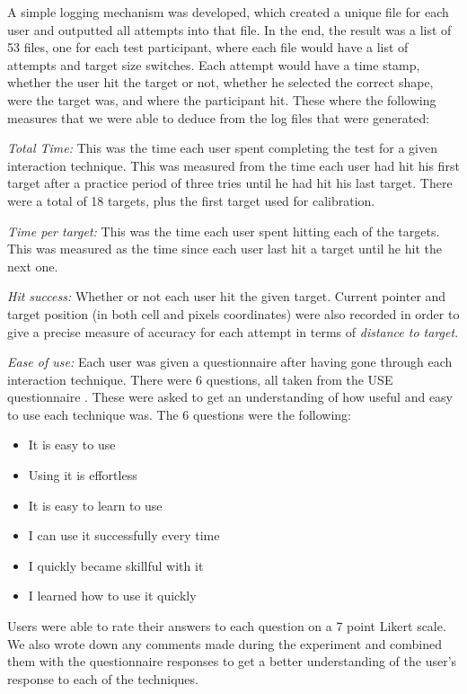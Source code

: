 A simple logging mechanism was developed, which created a unique file for each user and outputted all attempts into that file. 
In the end, the result was a list of 53 files, one for each test participant, where each file would have a list of attempts and target size switches. 
Each attempt would have a time stamp, whether the user hit the target or not, whether he selected the correct shape, were the target was, and where the participant hit. 
These where the following measures that we were able to deduce from the log files that were generated: 

\textit{Total Time:} This was the time each user spent completing the test for a given interaction technique. 
This was measured from the time each user had hit his first target after a practice period of three tries until he had hit his last target. 
There were a total of 18 targets, plus the first target used for calibration. 

\textit{Time per target:} This was the time each user spent hitting each of the targets. 
This was measured as the time since each user last hit a target until he hit the next one.

\textit{Hit success:} Whether or not each user hit the given target. 
Current pointer and target position (in both cell and pixels coordinates) were also recorded in order to give a precise measure of accuracy for each attempt in terms of \textit{distance to target}. 

\textit{Ease of use:} Each user was given a questionnaire after having gone through each interaction technique. 
There were 6 questions, all taken from the USE questionnaire \cite{lund2001measuring}. 
These were asked to get an understanding of how useful and easy to use each technique was. 
The 6 questions were the following: 

\begin{itemize}
	\item It is easy to use
	\item Using it is effortless
	\item It is easy to learn to use
	\item I can use it successfully every time
	\item I quickly became skillful with it
	\item I learned how to use it quickly
\end{itemize}

Users were able to rate their answers to each question on a 7 point Likert scale. 
We also wrote down any comments made during the experiment and combined them with the questionnaire responses to get a better understanding of the user's response to each of the techniques. 

